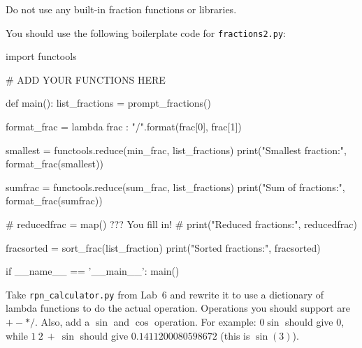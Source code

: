 \documentclass[11pt]{cselabheader}
\begin{document}
\begin{ex}[fractions2.py]
    Do not use any built-in fraction functions or libraries.

    You should use the following boilerplate code for \texttt{fractions2.py}:
    \begin{python3code}
import functools

# ADD YOUR FUNCTIONS HERE

def main():
  list_fractions = prompt_fractions()

  format_frac = lambda frac : "{}/{}".format(frac[0], frac[1])

  smallest = functools.reduce(min_frac, list_fractions)
  print("Smallest fraction:", format_frac(smallest))

  sumfrac = functools.reduce(sum_frac, list_fractions)
  print("Sum of fractions:", format_frac(sumfrac))

  # reducedfrac = map() ??? You fill in!
  # print("Reduced fractions:", reducedfrac)

  fracsorted = sort_frac(list_fraction)
  print("Sorted fractions:", fracsorted)

if __name__ == '__main__':
  main()
    \end{python3code}
  \end{ex}

  \begin{ex}[rpn.py] Take \texttt{rpn\_calculator.py} from Lab~6 and rewrite
    it to use a dictionary of lambda functions to do the actual operation.
    Operations you should support are $+ - * /$. Also, add a $\sin$ and $\cos$
    operation. For example: $0 \sin$ should give $0$, while $1~2~+~\sin$ should
    give $0.1411200080598672$ (this is $\sin(3)$).
  \end{ex}

%
%
%
%
%
\end{document}
